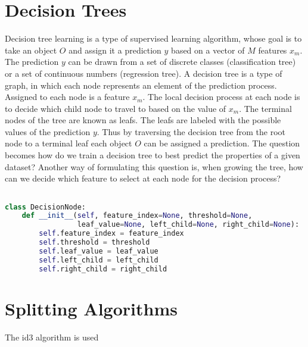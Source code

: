 \documentclass{article}
\begin{document}
\section{Decision Trees}
Decision tree learning is a type of supervised learning algorithm, whose goal is to take an object $O$ and assign it a prediction $y$ based on a vector of $M$ features $x_m$. The prediction $y$ can be drawn from a set of discrete classes (classification tree) or a set of continuous numbers (regression tree). A decision tree is a type of graph, in which each node represents an element of the prediction process. Assigned to each node is a feature $x_m$. The local decision process at each node is to decide which child node to travel to based on the value of $x_m$. The terminal nodes of the tree are known as leafs. The leafs are labeled with the possible values of the prediction $y$. Thus by traversing the decision tree from the root node to a terminal leaf each object $O$ can be assigned a prediction. The question becomes how do we train a decision tree to best predict the properties of a given dataset? Another way of formulating this question is, when growing the tree, how can we decide which feature to select at each node for the decision process?

\begin{lstlisting}[language=Python]

class DecisionNode:
    def __init__(self, feature_index=None, threshold=None,
                 leaf_value=None, left_child=None, right_child=None):
        self.feature_index = feature_index          
        self.threshold = threshold          
        self.leaf_value = leaf_value                  
        self.left_child = left_child      
        self.right_child = right_child
\end{lstlisting}

\section{Splitting Algorithms}
The id3 algorithm is used
\end{document}
